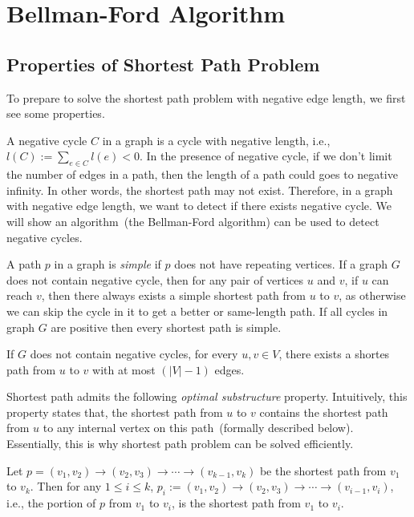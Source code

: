 \setcounter{definition}{0} \setcounter{property}{0} \setcounter{claim}{0} \setcounter{fact}{0} \setcounter{corollary}{0} \setcounter{figure}{0}
\section{Bellman-Ford Algorithm}

\subsection*{Properties of Shortest Path Problem}

To prepare to solve the shortest path problem with negative edge length, we first see some properties.

A negative cycle $C$ in a graph is a cycle with negative length, i.e., $l(C) := \sum_{e\in C} l(e) < 0$.
In the presence of negative cycle, if we don't limit the number of edges
in a path, then the length of a path could goes to negative infinity.
In other words, the shortest path may not exist.
Therefore, in a graph with negative edge length, we want to
detect if there exists negative cycle.
We will show an algorithm~(the Bellman-Ford algorithm) can be used to detect negative cycles.

A path $p$ in a graph is \emph{simple} if $p$ does not have repeating vertices.
If a graph $G$ does not contain negative cycle, then 
for any pair of vertices $u$ and $v$, if $u$ can reach $v$,
then there always exists a {simple} shortest path from $u$ to $v$,
as otherwise we can skip the cycle in it to get a better or same-length path.
If all cycles in graph $G$ are positive then every shortest path is simple.

\begin{property}
If $G$ does not contain negative cycles, for every $u,v\in V$, there exists a shortes path
from $u$ to $v$ with at most $(|V| - 1)$ edges.
\end{property}

Shortest path admits the following \emph{optimal substructure} property.
Intuitively, this property states that, the shortest path from $u$ to $v$
contains the shortest path from $u$ to any internal vertex on this path~(formally described below).
Essentially, this is why shortest path problem can be solved efficiently.

\begin{property}
Let $p = (v_1, v_2) \to (v_2, v_3) \to \cdots \to (v_{k-1}, v_k)$
be the shortest path from $v_1$ to $v_k$.
Then for any $1\le i \le k$,
$p_i := (v_1, v_2) \to (v_2, v_3) \to \cdots \to (v_{i-1}, v_i)$, i.e., the portion of $p$ from $v_1$ to $v_i$,
is the shortest path from $v_1$ to $v_i$.
\end{property}

